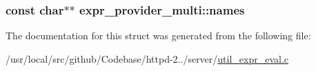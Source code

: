 \subsubsection[{\texorpdfstring{names}{names}}]{\setlength{\rightskip}{0pt plus 5cm}const char$\ast$$\ast$ expr\+\_\+provider\+\_\+multi\+::names}\hypertarget{structexpr__provider__multi_a8f2c124e649c74e344e3fc797998899b}{}\label{structexpr__provider__multi_a8f2c124e649c74e344e3fc797998899b}


The documentation for this struct was generated from the following file\+:\begin{DoxyCompactItemize}
\item 
/usr/local/src/github/\+Codebase/httpd-\/2../server/\hyperlink{util__expr__eval_8c}{util\+\_\+expr\+\_\+eval.\+c}\end{DoxyCompactItemize}
